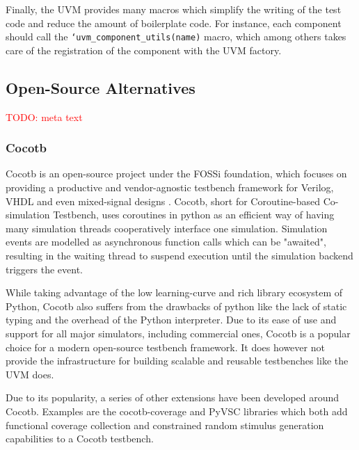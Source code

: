 \documentclass[11pt,a4paper]{report}
\newcommand{\ttt}{\texttt}
\newcommand{\todo}[1]{\textcolor{red}{TODO: #1}}
\begin{document}
Finally, the UVM provides many macros which simplify the writing of the test code and reduce the amount of
boilerplate code. For instance, each component should call the \ttt{`uvm\_component\_utils(name)} macro, which among
others takes care of the registration of the component with the UVM factory.


\subsection{Open-Source Alternatives} %

\todo{meta text}

\subsubsection{Cocotb} %

Cocotb is an open-source project under the FOSSi foundation, which focuses on providing a productive and
vendor-agnostic testbench framework for Verilog, VHDL and even mixed-signal designs \cite{cocotb}. Cocotb, short for
Coroutine-based Co-simulation Testbench, uses coroutines in python as an efficient way of having many simulation
threads cooperatively interface one simulation. Simulation events are modelled as asynchronous function calls which
can be "awaited", resulting in the waiting thread to suspend execution until the simulation backend triggers the event.

While taking advantage of the low learning-curve and rich library ecosystem of Python, Cocotb also suffers from the
drawbacks of python like the lack of static typing and the overhead of the Python interpreter. Due to its ease of use
and support for all major simulators, including commercial ones, Cocotb is a popular choice for a modern open-source
testbench framework. It does however not provide the infrastructure for building scalable and reusable testbenches
like the UVM does.

Due to its popularity, a series of other extensions have been developed around Cocotb. Examples are the
cocotb-coverage \cite{crvpython} and PyVSC \cite{pyvsc} libraries which both add functional coverage collection and
constrained random stimulus generation capabilities to a Cocotb testbench.
\end{document}
